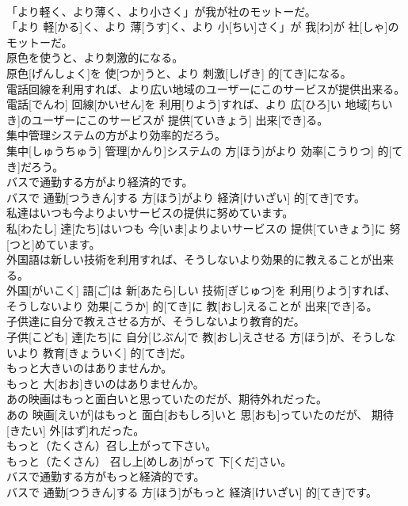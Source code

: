 \documentclass[8pt]{extreport}
\begin{document}
\begin{CJK}{UTF8}{min}
\\	「より軽く、より薄く、より小さく」が我が社のモットーだ。	
\\	「より 軽[かる]く、より 薄[うす]く、より 小[ちい]さく」が 我[わ]が 社[しゃ]のモットーだ。
\\	原色を使うと、より刺激的になる。	
\\	原色[げんしょく]を 使[つか]うと、より 刺激[しげき] 的[てき]になる。
\\	電話回線を利用すれば、より広い地域のユーザーにこのサービスが提供出来る。	
\\	電話[でんわ] 回線[かいせん]を 利用[りよう]すれば、より 広[ひろ]い 地域[ちいき]のユーザーにこのサービスが 提供[ていきょう] 出来[でき]る。
\\	集中管理システムの方がより効率的だろう。	
\\	集中[しゅうちゅう] 管理[かんり]システムの 方[ほう]がより 効率[こうりつ] 的[てき]だろう。
\\	バスで通勤する方がより経済的です。	
\\	バスで 通勤[つうきん]する 方[ほう]がより 経済[けいざい] 的[てき]です。
\\	私達はいつも今よりよいサービスの提供に努めています。	
\\	私[わたし] 達[たち]はいつも 今[いま]よりよいサービスの 提供[ていきょう]に 努[つと]めています。
\\	外国語は新しい技術を利用すれば、そうしないより効果的に教えることが出来る。	
\\	外国[がいこく] 語[ご]は 新[あたら]しい 技術[ぎじゅつ]を 利用[りよう]すれば、そうしないより 効果[こうか] 的[てき]に 教[おし]えることが 出来[でき]る。
\\	子供達に自分で教えさせる方が、そうしないより教育的だ。	
\\	子供[こども] 達[たち]に 自分[じぶん]で 教[おし]えさせる 方[ほう]が、そうしないより 教育[きょういく] 的[てき]だ。
\\	もっと大きいのはありませんか。	
\\	もっと 大[おお]きいのはありませんか。
\\	あの映画はもっと面白いと思っていたのだが、期待外れだった。	
\\	あの 映画[えいが]はもっと 面白[おもしろ]いと 思[おも]っていたのだが、 期待[きたい] 外[はず]れだった。
\\	もっと（たくさん）召し上がって下さい。	
\\	もっと（たくさん） 召し上[めしあ]がって 下[くだ]さい。
\\	バスで通勤する方がもっと経済的です。	
\\	バスで 通勤[つうきん]する 方[ほう]がもっと 経済[けいざい] 的[てき]です。

\end{CJK}
\end{document}
